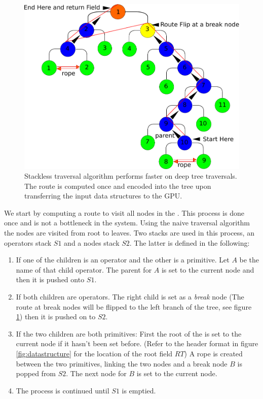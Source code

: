 \begin{figure}[H]
  \centering
  \includegraphics[width=1.0\linewidth]{figures/gpupoly/stackless.pdf}
  \caption{\label{fig:stackless}
  {Stackless \blob traversal algorithm performs faster on deep tree traversals. The route is computed once and encoded into the tree upon transferring the input 
  data structures to the GPU.}
}
\end{figure}

We start by computing a route to visit all nodes in the \blob. This process is done once and is not a bottleneck in the system.
Using the naive \blob traversal algorithm the nodes are visited from root to leaves. Two stacks are used in this process, an
operators stack $S1$ and a  nodes stack $S2$. The latter is defined in the following:

\begin{enumerate}
 \item If one of the children is an operator and the other is a primitive. Let $A$ be the name of that child operator. The parent for $A$ is set 
 to the current node and then it is pushed onto $S1$.
 
 \item If both children are operators. The right child is set as a \textit{break} node (The route at break nodes will be flipped to 
 the left branch of the tree, see figure \ref{fig:stackless}) then it is pushed on to $S2$.
 
 \item If the two children are both primitives: First the root of the \blob is set to the current node if it hasn't been set before.
  (Refer to the \blob header format in figure \ref{fig:datastructure} for the location of the root field $RT$) 
  A rope is created between the two primitives, linking the two nodes and a break node $B$ is popped from $S2$. 
  The next node for $B$ is set to the current node.
 
  
 \item The process is continued until $S1$ is emptied.
\end{enumerate}


